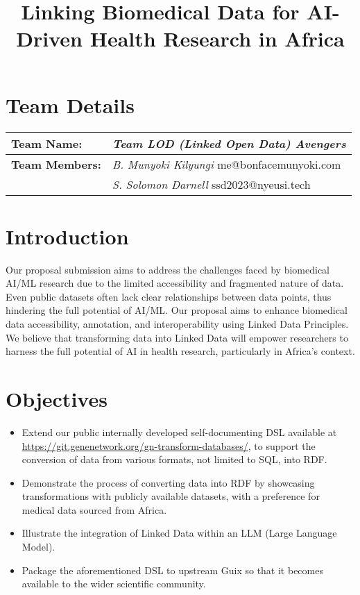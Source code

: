 \documentclass[notitlepage,11pt]{article}
\date{}
\title{Linking Biomedical Data for AI-Driven Health Research in Africa}
\begin{document}
\maketitle
\pagestyle{empty}
\vspace{-5em}
\section*{Team Details}
\label{sec:orge1b7bd3}
\begin{center}
\begin{tabular}{ll}
\textbf{\textbf{Team Name:}} & \emph{Team LOD (Linked Open Data) Avengers}\\
\hline
\textbf{\textbf{Team Members:}} & \emph{B.  Munyoki Kilyungi} me@bonfacemunyoki.com\\
 & \emph{S. Solomon Darnell} ssd2023@nyeusi.tech\\
\end{tabular}
\end{center}


\section*{Introduction}
\label{sec:org2744d4e}

Our proposal submission aims to address the challenges faced by biomedical AI/ML research due to the limited accessibility and fragmented nature of data.  Even public datasets often lack clear relationships between data points, thus hindering the full potential of AI/ML.  Our proposal aims to enhance biomedical data accessibility, annotation, and interoperability using Linked Data Principles.  We believe that transforming data into Linked Data will empower researchers to harness the full potential of AI in health research, particularly in Africa's context.

\section*{Objectives}
\label{sec:org0dfaacb}

\begin{itemize}
\item Extend our public internally developed self-documenting DSL available at \url{https://git.genenetwork.org/gn-transform-databases/}, to support the conversion of data from various formats, not limited to SQL, into RDF.
\item Demonstrate the process of converting data into RDF by showcasing transformations with publicly available datasets, with a preference for medical data sourced from Africa.
\item Illustrate the integration of Linked Data within an LLM (Large Language Model).
\item Package the aforementioned DSL to upstream Guix so that it becomes available to the wider scientific community.
\end{itemize}
\end{document}
